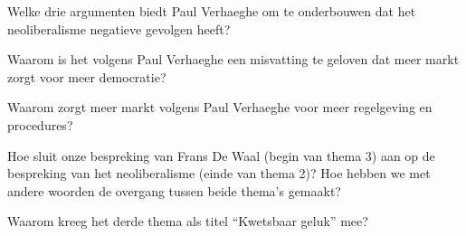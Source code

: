 \documentclass[main.tex]{subfiles}
\begin{document}
\begin{examenvraag}
    \begin{vraag}
        Welke drie argumenten biedt Paul Verhaeghe om te onderbouwen dat het neoliberalisme negatieve gevolgen heeft?
    \end{vraag}

    \begin{antwoord}
    \end{antwoord}
\end{examenvraag}


\begin{examenvraag}
    \begin{vraag}
        Waarom is het volgens Paul Verhaeghe een misvatting te geloven dat meer markt zorgt voor meer democratie?
    \end{vraag}

    \begin{antwoord}
    \end{antwoord}
\end{examenvraag}


\begin{examenvraag}
    \begin{vraag}
        Waarom zorgt meer markt volgens Paul Verhaeghe voor meer regelgeving en procedures?
    \end{vraag}

    \begin{antwoord}
    \end{antwoord}
\end{examenvraag}


\begin{examenvraag}
    \begin{vraag}
        Hoe sluit onze bespreking van Frans De Waal (begin van thema 3) aan op de bespreking van het neoliberalisme (einde van thema 2)? Hoe hebben we met andere woorden de overgang tussen beide thema’s gemaakt?
    \end{vraag}

    \begin{antwoord}
    \end{antwoord}
\end{examenvraag}


\begin{examenvraag}
    \begin{vraag}
        Waarom kreeg het derde thema als titel “Kwetsbaar geluk” mee?
    \end{vraag}

    \begin{antwoord}
    \end{antwoord}
\end{examenvraag}
\end{document}
